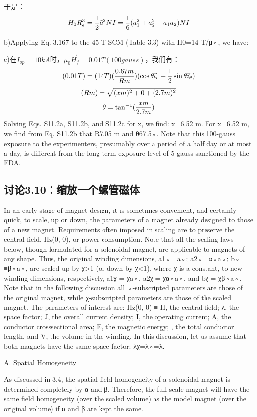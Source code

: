 于是：
$$
H_{0}R_{e}^{3}=\frac{1}{2}\tilde{a}^{2}NI=\frac{1}{6}(a_{1}^{2}+a_{2}^{2}+a_{1}a_{2})NI\\%
$$

b)Applying Eq. 3.167 to the 45-T SCM (Table 3.3) with H0=14 T/μ◦, we have:

c)在$I_{op}=10 kA$时，$\mu_0 \vec{H}_f=0.01 T (100 gauss)$，我们有：
$$
(0.01T)=(14T)(\frac{0.67m}{Rm})(\cos\theta\vec{\imath}_{r}+\frac{1}{2}\sin\theta\vec{\imath}_{\theta})\\%
$$
$$
(Rm)=\sqrt{(xm)^{2}+0+(2.7m)^{2}}\\%
$$
$$
\theta=\tan^{-1}(\frac{xm}{2.7m})\\%
$$
Solving Eqs. S11.2a, S11.2b, and S11.2c for x, we find: x=6.52 m. For x=6.52 m,
we find from Eq. S11.2b that R7.05 m and θ67.5◦.
Note that this 100-gauss exposure to the experimenters, presumably over a period
of a half day or at most a day, is different from the long-term exposure level of
5 gauss sanctioned by the FDA.
\newpage


\subsection{讨论3.10：缩放一个螺管磁体}
In an early stage of magnet design, it is sometimes convenient, and certainly quick,
to scale, up or down, the parameters of a magnet already designed to those of a
new magnet. Requirements often imposed in scaling are to preserve the central
field, Hz(0, 0), or power consumption. Note that all the scaling laws below, though
formulated for a solenoidal magnet, are applicable to magnets of any shape.
Thus, the original winding dimensions, a1◦ ≡a◦; a2◦ ≡α◦a◦; b◦ ≡β◦a◦, are scaled
up by χ>1 (or down by χ<1), where χ is a constant, to new winding dimensions,
respectively, a1χ = χa◦, a2χ = χα◦a◦, and bχ = χβ◦a◦. Note that in the following
discussion all ◦-subscripted parameters are those of the original magnet, while
χ-subscripted parameters are those of the scaled magnet.
The parameters of interest are: Hz(0, 0) ≡ H, the central field; λ, the space factor;
J, the overall current density; I, the operating current; A, the conductor crosssectional area; E, the magnetic energy; , the total conductor length, and V, the
volume in the winding. In this discussion, let us assume that both magnets have
the same space factor: λχ=λ◦=λ.

A. Spatial Homogeneity

As discussed in 3.4, the spatial field homogeneity of a solenoidal magnet is determined completely by α and β. Therefore, the full-scale magnet will have the same
field homogeneity (over the scaled volume) as the model magnet (over the original
volume) if α and β are kept the same.

